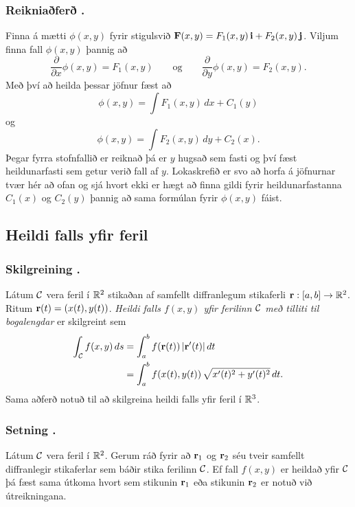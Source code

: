 \subsubsection{Reikniaðferð \kaflanr.}
 Finna á mætti $\phi(x,y)$ fyrir stigulsvið  $\mbox{${\bf F}$}(x,y)=F_1(x,y)\,\mbox{${\bf i}$}+F_2(x,y)\,\mbox{${\bf j}$}$.  Viljum finna fall $\phi(x,y)$ þannig að 
$$\frac{\partial}{\partial x}\phi(x,y)=F_1(x,y)\qquad
\mbox{og}\qquad \frac{\partial}{\partial y}\phi(x,y)=F_2(x,y).$$
 Með því að heilda þessar jöfnur fæst að 
 $$\phi(x,y)=\int F_1(x,y)\,dx+C_1(y)$$
og
$$\phi(x,y)=\int F_2(x,y)\,dy+C_2(x).$$
Þegar fyrra stofnfallið er reiknað þá er $y$ hugsað sem fasti og því fæst heildunarfasti sem getur verið fall af $y$.  Lokaskrefið er  svo að horfa á jöfnurnar tvær hér að ofan og sjá hvort ekki er hægt að finna gildi fyrir heildunarfastanna $C_1(x)$ og $C_2(y)$ þannig að sama formúlan fyrir $\phi(x,y)$ fáist.  



\subsection{Heildi falls yfir feril} 

\subsubsection{Skilgreining \kaflanr.}
Látum $\cal C$ vera feril í ${\mathbb R}^2$ stikaðan af samfellt diffranlegum stikaferli $\mbox{${\bf r}$}:[a,b]\rightarrow{\mathbb R}^2$.  Ritum $\mbox{${\bf r}$}(t)=(x(t),y(t))$.  {\em Heildi falls $f(x,y)$ yfir ferilinn $\cal C$ með tilliti til bogalengdar} er skilgreint sem 
\begin{align*}  
\int_{\cal C}f(x,y)\,ds&=\int_a^b f(\mbox{${\bf r}$}(t))\,|\mbox{${\bf r}$}'(t)|\,dt\\
&=\int_a^b f(x(t),y(t))\,\sqrt{x'(t)^2+y'(t)^2}\,dt.\end{align*}
Sama aðferð notuð til að skilgreina heildi falls yfir feril í ${\mathbb R}^3$.



\subsubsection{Setning \kaflanr.}
 Látum $\cal C$ vera feril í ${\mathbb R}^2$.  Gerum ráð fyrir að $\mbox{${\bf r}$}_1$ og $\mbox{${\bf r}$}_2$ séu tveir samfellt diffranlegir stikaferlar sem báðir stika ferilinn $\cal C$.  Ef fall $f(x,y)$ er heildað yfir $\cal C$ þá fæst sama útkoma hvort sem stikunin $\mbox{${\bf r}$}_1$ eða stikunin $\mbox{${\bf r}$}_2$ er notuð við útreikningana.




